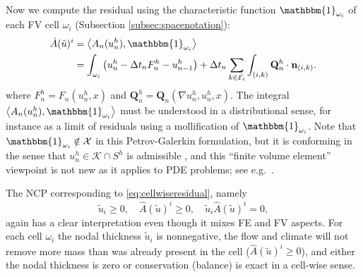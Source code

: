 \documentclass[final,onefignum]{siamart190516}
\newcommand\bn{\mathbf{n}}
\newcommand\bQ{\mathbf{Q}}
\newcommand{\grad}{\nabla}
\newcommand{\ip}[2]{\ensuremath{\left<#1,#2\right>}}
\begin{document}
Now we compute the residual using the characteristic function $\mathbbm{1}_{\omega_i}$ of each FV cell $\omega_i$ (Subsection \ref{subsec:spacenotation}):
\begin{align}
\hat A(\tilde u)^i &= \ip{A_n(u_n^h)}{\mathbbm{1}_{\omega_i}}  \label{eq:cellwiseresidual} \\
                   &= \int_{\omega_i} \left(u_n^h - \Delta t_n F_n^h - u_{n-1}^h\right) + \Delta t_n \sum_{k\in\mathcal{E}_i} \int_{(i,k)} \bQ_n^h\cdot \bn_{(i,k)}. \notag
\end{align}
where $F_n^h = F_n(u_n^h,x)$ and $\bQ_n^h = \bQ_n(\grad u_n^h, u_n^h,x)$.  The integral $\ip{A_n(u_n^h)}{\mathbbm{1}_{\omega_i}}$ must be understood in a distributional sense, for instance as a limit of residuals using a mollification of $\mathbbm{1}_{\omega_i}$.  Note that $\mathbbm{1}_{\omega_i} \notin \mathcal{X}$ in this Petrov-Galerkin formulation, but it is conforming in the sense that $u_n^h\in \mathcal{K}\cap S^h$ is admissible \cite{Elmanetal2014}, and this ``finite volume element'' viewpoint is not new as it applies to PDE problems; see e.g.~\cite{Cai1990,EwingLinLin2002}.

The NCP corresponding to \eqref{eq:cellwiseresidual}, namely
\begin{equation}
\tilde u_i \ge 0, \quad \hat A(\tilde u)^i \ge 0, \quad \tilde u_i \hat A(\tilde u)^i = 0, \label{eq:FVtheNCP}
\end{equation}
again has a clear interpretation even though it mixes FE and FV aspects.  For each cell $\omega_i$ the nodal thickness $\tilde u_i$ is nonnegative, the flow and climate will not remove more mass than was already present in the cell ($\hat A(\tilde u)^i \ge 0$), and either the nodal thickness is zero or conservation (balance) is exact in a cell-wise sense.
\end{document}
